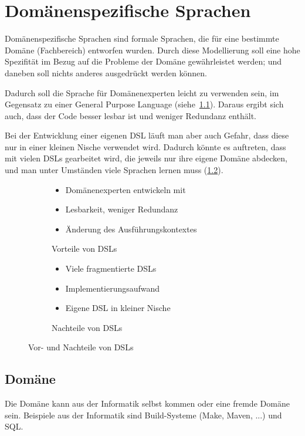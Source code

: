 \documentclass[../InterneDSLs.tex]{subfiles}
\begin{document}
\chapter{Domänenspezifische Sprachen}
Domänenspezifische Sprachen sind formale Sprachen, die für eine bestimmte Domäne (Fachbereich) entworfen wurden. Durch diese Modellierung soll eine hohe Spezifität im Bezug auf die Probleme der Domäne gewährleistet werden; und daneben soll nichts anderes ausgedrückt werden können.

Dadurch soll die Sprache für Domänenexperten leicht zu verwenden sein, im Gegensatz zu einer General Purpose Language (siehe~\ref{FIG:DslAdvantages}). Daraus ergibt sich auch, dass der Code besser lesbar ist und weniger Redundanz enthält.

Bei der Entwicklung einer eigenen DSL läuft man aber auch Gefahr, dass diese nur in einer kleinen Nische verwendet wird. Dadurch könnte es auftreten, dass mit vielen DSLs gearbeitet wird, die jeweils nur ihre eigene Domäne abdecken, und man unter Umständen viele Sprachen lernen muss (\ref{FIG:DslDisadvantages}).

\begin{figure}[ht]
\centering
  \begin{subfigure}[c]{0.49\textwidth}
    \begin{itemize}
	  \item Domänenexperten entwickeln mit
	  \item Lesbarkeit, weniger Redundanz
	  \item Änderung des Ausführungskontextes
    \end{itemize}
    \caption{Vorteile von DSLs}
    \label{FIG:DslAdvantages}
  \end{subfigure}
  \begin{subfigure}[c]{0.49\textwidth}
    \begin{itemize}
	  \item Viele fragmentierte DSLs
	  \item Implementierungsaufwand
	  \item Eigene DSL in kleiner Nische
    \end{itemize}
    \caption{Nachteile von DSLs}
    \label{FIG:DslDisadvantages}
  \end{subfigure}
  \caption{Vor- und Nachteile von DSLs}
  \label{FIG:DslAdvantagesDisadvantages}
\end{figure}


\section{Domäne}
Die Domäne kann aus der Informatik selbst kommen oder eine fremde Domäne sein. Beispiele aus der Informatik sind Build-Systeme (Make, Maven, ...) und SQL.
\end{document}
